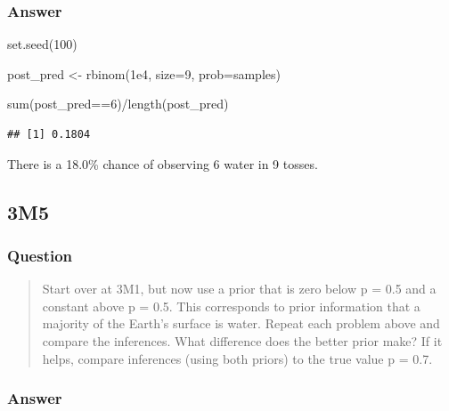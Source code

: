 \documentclass[
]{book}
\newenvironment{Shaded}{\begin{snugshade}}{\end{snugshade}}
\newcommand{\AttributeTok}[1]{\textcolor[rgb]{0.77,0.63,0.00}{#1}}
\newcommand{\DecValTok}[1]{\textcolor[rgb]{0.00,0.00,0.81}{#1}}
\newcommand{\FloatTok}[1]{\textcolor[rgb]{0.00,0.00,0.81}{#1}}
\newcommand{\FunctionTok}[1]{\textcolor[rgb]{0.00,0.00,0.00}{#1}}
\newcommand{\NormalTok}[1]{#1}
\newcommand{\OtherTok}[1]{\textcolor[rgb]{0.56,0.35,0.01}{#1}}
\newcommand{\SpecialCharTok}[1]{\textcolor[rgb]{0.00,0.00,0.00}{#1}}
\begin{document}
\hypertarget{answer-25}{%
\subsubsection*{Answer}\label{answer-25}}

\begin{Shaded}
\begin{Highlighting}[]
\FunctionTok{set.seed}\NormalTok{(}\DecValTok{100}\NormalTok{)}

\NormalTok{post\_pred }\OtherTok{\textless{}{-}} \FunctionTok{rbinom}\NormalTok{(}\FloatTok{1e4}\NormalTok{, }\AttributeTok{size=}\DecValTok{9}\NormalTok{, }\AttributeTok{prob=}\NormalTok{samples)}

\FunctionTok{sum}\NormalTok{(post\_pred}\SpecialCharTok{==}\DecValTok{6}\NormalTok{)}\SpecialCharTok{/}\FunctionTok{length}\NormalTok{(post\_pred)}
\end{Highlighting}
\end{Shaded}

\begin{verbatim}
## [1] 0.1804
\end{verbatim}

There is a 18.0\% chance of observing 6 water in 9 tosses.

\hypertarget{m5-1}{%
\subsection*{3M5}\label{m5-1}}

\hypertarget{question-26}{%
\subsubsection*{Question}\label{question-26}}

\begin{quote}
Start over at 3M1, but now use a prior that is zero below p = 0.5 and a constant above p = 0.5. This corresponds to prior information that a majority of the Earth's surface is water. Repeat each problem above and compare the inferences. What difference does the better prior make? If it helps, compare inferences (using both priors) to the true value p = 0.7.
\end{quote}

\hypertarget{answer-26}{%
\subsubsection*{Answer}\label{answer-26}}
\end{document}
